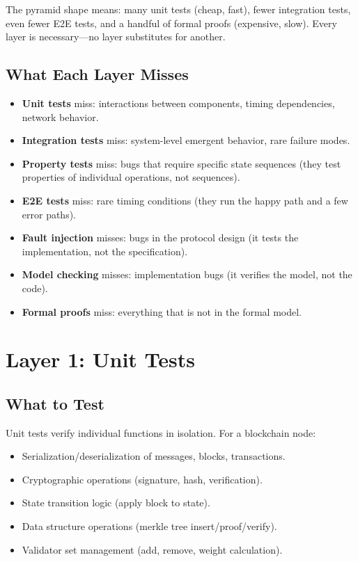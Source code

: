 \documentclass[11pt,a4paper]{article}
\begin{document}
The pyramid shape means: many unit tests (cheap, fast), fewer integration tests, even
fewer E2E tests, and a handful of formal proofs (expensive, slow). Every layer is
necessary---no layer substitutes for another.

\subsection{What Each Layer Misses}

\begin{itemize}[nosep]
  \item \textbf{Unit tests} miss: interactions between components, timing dependencies,
    network behavior.
  \item \textbf{Integration tests} miss: system-level emergent behavior, rare failure modes.
  \item \textbf{Property tests} miss: bugs that require specific state sequences (they test
    properties of individual operations, not sequences).
  \item \textbf{E2E tests} miss: rare timing conditions (they run the happy path and a few
    error paths).
  \item \textbf{Fault injection} misses: bugs in the protocol design (it tests the
    implementation, not the specification).
  \item \textbf{Model checking} misses: implementation bugs (it verifies the model, not the code).
  \item \textbf{Formal proofs} miss: everything that is not in the formal model.
\end{itemize}

\section{Layer 1: Unit Tests}

\subsection{What to Test}

Unit tests verify individual functions in isolation. For a blockchain node:

\begin{itemize}[nosep]
  \item Serialization/deserialization of messages, blocks, transactions.
  \item Cryptographic operations (signature, hash, verification).
  \item State transition logic (apply block to state).
  \item Data structure operations (merkle tree insert/proof/verify).
  \item Validator set management (add, remove, weight calculation).
\end{itemize}
\end{document}
